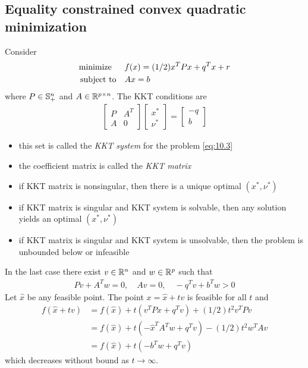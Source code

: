 \subsection{Equality constrained convex quadratic minimization}
\label{subsec:10.1.1}
Consider
\begin{align}
  \text{minimize\;\;}\quad& f(x)=(1/2)x^TPx+q^Tx+r \label{eq:10.3}\\
  \text{subject to}  \quad& Ax=b\nonumber
\end{align}
where $P\in\mathbb{S}_+^n$ and $A\in\mathbb{R}^{p\times n}$. The KKT conditions are
\begin{align}
  \begin{bmatrix}
    P&A^T\\A&0
  \end{bmatrix}
  \begin{bmatrix}
    x^\ast\\\nu^\ast
  \end{bmatrix}=
  \begin{bmatrix}
    -q\\b
  \end{bmatrix}\label{eq:10.4}
\end{align}
\begin{itemize}
  \item this set is called the \textit{KKT system} for the problem \eqref{eq:10.3}
  \item the coefficient matrix is called the \textit{KKT matrix}
  \item if KKT matrix is nonsingular, then there is a unique optimal $(x^\ast,\nu^\ast)$
  \item if KKT matrix is singular and KKT system is solvable, then any solution yields an optimal $(x^\ast,\nu^\ast)$
  \item if KKT matrix is singular and KKT system is unsolvable, then the problem is unbounded below or infeasible
\end{itemize}
In the last case there exist $v\in\mathbb{R}^n$ and $w\in\mathbb{R}^p$ such that
\begin{align*}
  Pv+A^Tw=0,\quad Av=0,\quad -q^Tv+b^Tw>0
\end{align*}
Let $\hat{x}$ be any feasible point. The point $x=\hat{x}+tv$ is feasible for all $t$ and
\begin{align*}
  f(\hat{x}+tv) &= f(\hat{x})+t(v^TP\hat{x}+q^Tv)+(1/2)t^2v^TPv\\
                &= f(\hat{x})+t(-\hat{x}^TA^Tw+q^Tv)-(1/2)t^2w^TAv\\
                &= f(\hat{x})+t(-b^Tw+q^Tv)
\end{align*}
which decreases without bound as $t\rightarrow\infty$.

